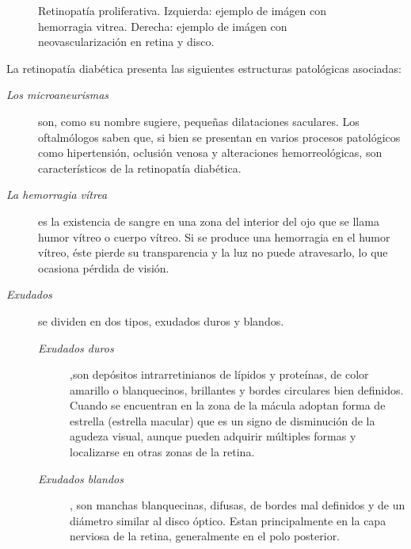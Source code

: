 \begin{description}
\begin{figure}[H]
{	\caption[Retinopat\'ia diab\'etica]{Retinopat\'ia proliferativa. Izquierda: ejemplo de im\'agen con hemorragia vitrea. Derecha: ejemplo de im\'agen con neovascularizaci\'on en retina y disco.}
	\label{fig:RetinopatiaProliferativa}
	}
\end{figure}
\end{description}
La retinopat\'ia diab\'etica presenta las siguientes estructuras patol\'ogicas asociadas:
\begin{description}
\item[\normalfont\textit{Los microaneurismas}] son, como su nombre sugiere, peque\~nas dilataciones saculares. Los oftalm\'ologos saben que, si bien se presentan en varios procesos patol\'ogicos como hipertensi\'on, oclusi\'on venosa y alteraciones hemorreol\'ogicas, son caracter\'isticos de la retinopat\'ia diab\'etica.
\item[\normalfont\textit{La hemorragia v\'itrea}] es la existencia de sangre en una zona del interior del ojo que se llama humor v\'itreo o cuerpo v\'itreo. Si se produce una hemorragia en el humor v\'itreo, \'este pierde su transparencia y la luz no puede atravesarlo, lo que ocasiona p\'erdida de visi\'on.
\item[\normalfont\textit{Exudados}] se dividen en dos tipos, exudados duros y blandos.
\begin{description}
	\item[\normalfont\textit{Exudados duros}],son dep\'ositos intrarretinianos de l\'ipidos y prote\'inas, de color amarillo o blanquecinos, brillantes y bordes circulares bien definidos. Cuando se encuentran en la zona de la m\'acula adoptan forma de estrella (estrella macular) que es un signo de disminuci\'on de la agudeza visual, aunque pueden adquirir m\'ultiples formas y localizarse en otras zonas de la retina.\cite{niemeijer2007automated} 
\item[\normalfont\textit{ Exudados blandos}], son manchas blanquecinas, difusas, de bordes mal definidos y de un di\'ametro similar al disco \'optico. Estan principalmente en la capa nerviosa de la retina, generalmente en el polo posterior.\cite{niemeijer2007automated}
\end{description}
\end{description}

